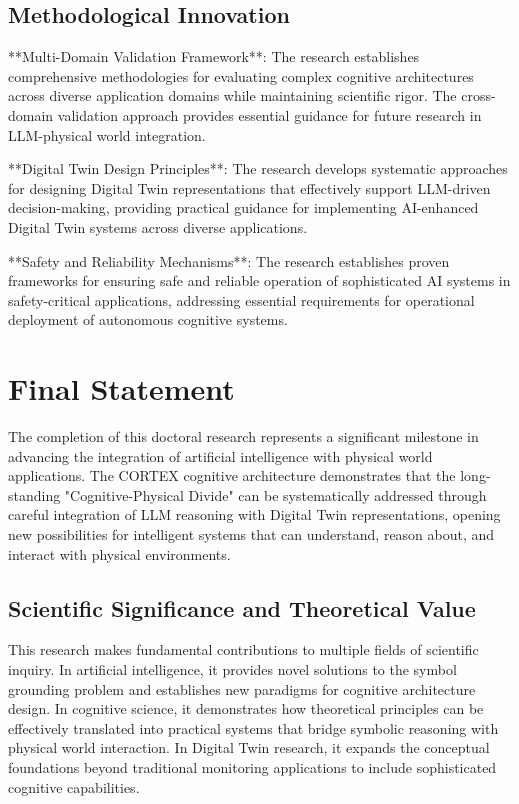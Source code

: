 \subsection{Methodological Innovation}

**Multi-Domain Validation Framework**: The research establishes comprehensive methodologies for evaluating complex cognitive architectures across diverse application domains while maintaining scientific rigor. The cross-domain validation approach provides essential guidance for future research in LLM-physical world integration.

**Digital Twin Design Principles**: The research develops systematic approaches for designing Digital Twin representations that effectively support LLM-driven decision-making, providing practical guidance for implementing AI-enhanced Digital Twin systems across diverse applications.

**Safety and Reliability Mechanisms**: The research establishes proven frameworks for ensuring safe and reliable operation of sophisticated AI systems in safety-critical applications, addressing essential requirements for operational deployment of autonomous cognitive systems.

\section{Final Statement}

The completion of this doctoral research represents a significant milestone in advancing the integration of artificial intelligence with physical world applications. The CORTEX cognitive architecture demonstrates that the long-standing "Cognitive-Physical Divide" can be systematically addressed through careful integration of LLM reasoning with Digital Twin representations, opening new possibilities for intelligent systems that can understand, reason about, and interact with physical environments.

\subsection{Scientific Significance and Theoretical Value}

This research makes fundamental contributions to multiple fields of scientific inquiry. In artificial intelligence, it provides novel solutions to the symbol grounding problem and establishes new paradigms for cognitive architecture design. In cognitive science, it demonstrates how theoretical principles can be effectively translated into practical systems that bridge symbolic reasoning with physical world interaction. In Digital Twin research, it expands the conceptual foundations beyond traditional monitoring applications to include sophisticated cognitive capabilities.

